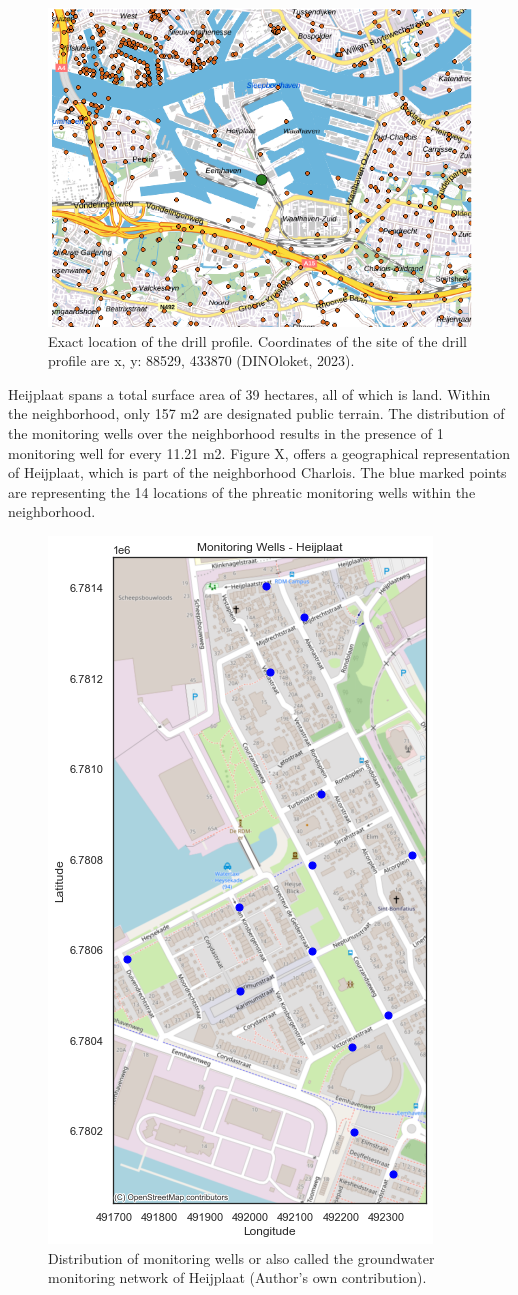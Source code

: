 \begin{figure}[htbp]
    \centering
    \includegraphics[width=0.40\linewidth]{figures/heij/boor.png}
    \caption{Exact location of the drill profile. Coordinates of the site of the drill profile are x, y: 88529, 433870 (DINOloket, 2023).}
\end{figure}

Heijplaat spans a total surface area of 39 hectares, all of which is land. Within the neighborhood, only 157 m2 are designated public terrain. The distribution of the monitoring wells over the neighborhood results in the presence of 1 monitoring well for every 11.21 m2. Figure X, offers a geographical representation of Heijplaat, which is part of the neighborhood Charlois. The blue marked points are representing the 14 locations of the phreatic monitoring wells within the neighborhood. 

\begin{figure}[h]
    \centering
    \includegraphics[width=0.70\linewidth]{figures/heij/basicheij.png}
    \caption{Distribution of monitoring wells or also called the groundwater monitoring network of Heijplaat (Author's own contribution).}
\end{figure}










